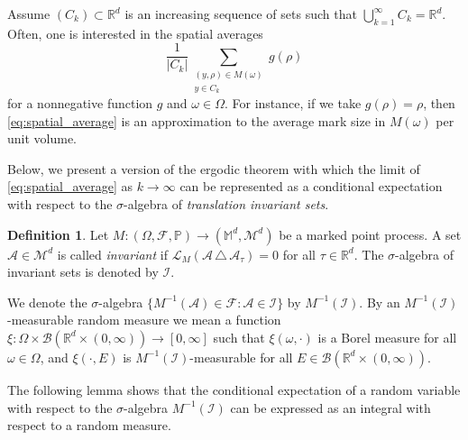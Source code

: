 \documentclass{article}
\numberwithin{equation}{section}
\theoremstyle{definition}
\newtheorem{definition}[theorem]{Definition}
\theoremstyle{remark}
\begin{document}
Assume $(C_k) \subset \mathbb{R}^d$ is an increasing sequence of sets such that $\bigcup_{k = 1}^\infty C_k = \mathbb{R}^d$. Often, one is interested in the spatial averages
\begin{equation} \label{eq:spatial_average}
    \frac{1}{|C_k|} \sum \limits_{\substack{(y, \rho) \in M(\omega) \\ y \in C_k}} g(\rho)
\end{equation}
for a nonnegative function $g$ and $\omega \in \Omega$. For instance, if we take $g(\rho) = \rho$, then \eqref{eq:spatial_average} is an approximation to the average mark size in $M(\omega)$ per unit volume.

Below, we present a version of the ergodic theorem with which the limit of \eqref{eq:spatial_average} as $k \to \infty$ can be represented as a conditional expectation with respect to the $\sigma$-algebra of \textit{translation invariant sets}.

\begin{definition}
    Let $M : (\Omega, \mathcal{F}, \mathbb{P}) \rightarrow (\mathbb{M}^d, \mathcal{M}^d)$ be a marked point process. A set $\mathcal{A} \in \mathcal{M}^d$ is called \textit{invariant} if $\mathcal{L}_M(\mathcal{A} \,\triangle\, \mathcal{A}_\tau) = 0$ for all $\tau \in \mathbb{R}^d$. The $\sigma$-algebra of invariant sets is denoted by $\mathcal{I}$.
\end{definition}
We denote the $\sigma$-algebra $\{M^{-1}(\mathcal{A}) \in \mathcal{F}: \mathcal{A} \in \mathcal{I}\}$ by $M^{-1}(\mathcal{I})$. By an $M^{-1}(\mathcal{I})$-measurable random measure we mean a function $\xi : \Omega \times \mathcal{B}(\mathbb{R}^d \times (0, \infty)) \rightarrow [0, \infty]$ such that $\xi(\omega, \cdot)$ is a Borel measure for all $\omega \in \Omega$, and $\xi(\cdot, E)$ is $M^{-1}(\mathcal{I})$-measurable for all $E \in \mathcal{B}(\mathbb{R}^d \times (0, \infty))$.

The following lemma shows that the conditional expectation of a random variable with respect to the $\sigma$-algebra $M^{-1}(\mathcal{I})$ can be expressed as an integral with respect to a random measure.
\end{document}
